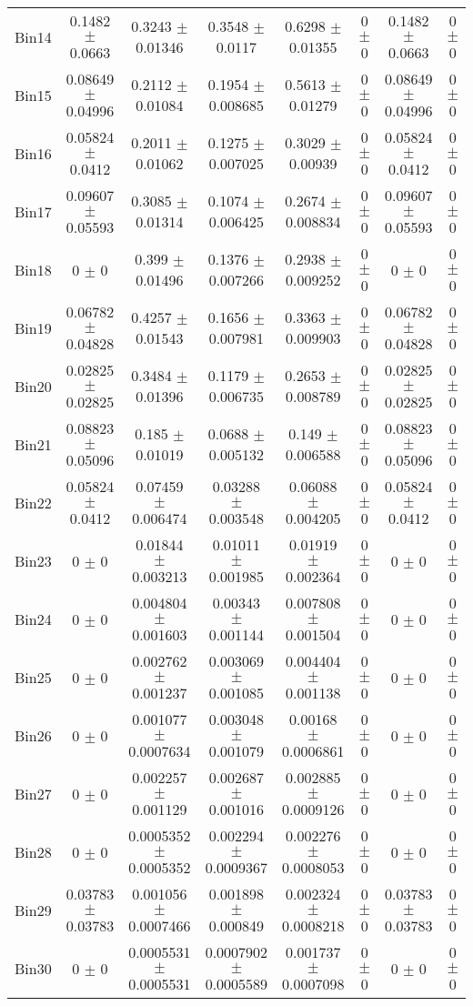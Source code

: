 \begin{tabular}{@{\extracolsep{4pt}}lccccccc@{}}
     Bin14 & 0.1482 $\pm$ 0.0663 & 0.3243 $\pm$ 0.01346 & 0.3548 $\pm$ 0.0117 & 0.6298 $\pm$ 0.01355 & 0 $\pm$ 0 & 0.1482 $\pm$ 0.0663 & 0 $\pm$ 0 \\ 
     Bin15 & 0.08649 $\pm$ 0.04996 & 0.2112 $\pm$ 0.01084 & 0.1954 $\pm$ 0.008685 & 0.5613 $\pm$ 0.01279 & 0 $\pm$ 0 & 0.08649 $\pm$ 0.04996 & 0 $\pm$ 0 \\ 
     Bin16 & 0.05824 $\pm$ 0.0412 & 0.2011 $\pm$ 0.01062 & 0.1275 $\pm$ 0.007025 & 0.3029 $\pm$ 0.00939 & 0 $\pm$ 0 & 0.05824 $\pm$ 0.0412 & 0 $\pm$ 0 \\ 
     Bin17 & 0.09607 $\pm$ 0.05593 & 0.3085 $\pm$ 0.01314 & 0.1074 $\pm$ 0.006425 & 0.2674 $\pm$ 0.008834 & 0 $\pm$ 0 & 0.09607 $\pm$ 0.05593 & 0 $\pm$ 0 \\ 
     Bin18 & 0 $\pm$ 0 & 0.399 $\pm$ 0.01496 & 0.1376 $\pm$ 0.007266 & 0.2938 $\pm$ 0.009252 & 0 $\pm$ 0 & 0 $\pm$ 0 & 0 $\pm$ 0 \\ 
     Bin19 & 0.06782 $\pm$ 0.04828 & 0.4257 $\pm$ 0.01543 & 0.1656 $\pm$ 0.007981 & 0.3363 $\pm$ 0.009903 & 0 $\pm$ 0 & 0.06782 $\pm$ 0.04828 & 0 $\pm$ 0 \\ 
     Bin20 & 0.02825 $\pm$ 0.02825 & 0.3484 $\pm$ 0.01396 & 0.1179 $\pm$ 0.006735 & 0.2653 $\pm$ 0.008789 & 0 $\pm$ 0 & 0.02825 $\pm$ 0.02825 & 0 $\pm$ 0 \\ 
     Bin21 & 0.08823 $\pm$ 0.05096 & 0.185 $\pm$ 0.01019 & 0.0688 $\pm$ 0.005132 & 0.149 $\pm$ 0.006588 & 0 $\pm$ 0 & 0.08823 $\pm$ 0.05096 & 0 $\pm$ 0 \\ 
     Bin22 & 0.05824 $\pm$ 0.0412 & 0.07459 $\pm$ 0.006474 & 0.03288 $\pm$ 0.003548 & 0.06088 $\pm$ 0.004205 & 0 $\pm$ 0 & 0.05824 $\pm$ 0.0412 & 0 $\pm$ 0 \\ 
     Bin23 & 0 $\pm$ 0 & 0.01844 $\pm$ 0.003213 & 0.01011 $\pm$ 0.001985 & 0.01919 $\pm$ 0.002364 & 0 $\pm$ 0 & 0 $\pm$ 0 & 0 $\pm$ 0 \\ 
     Bin24 & 0 $\pm$ 0 & 0.004804 $\pm$ 0.001603 & 0.00343 $\pm$ 0.001144 & 0.007808 $\pm$ 0.001504 & 0 $\pm$ 0 & 0 $\pm$ 0 & 0 $\pm$ 0 \\ 
     Bin25 & 0 $\pm$ 0 & 0.002762 $\pm$ 0.001237 & 0.003069 $\pm$ 0.001085 & 0.004404 $\pm$ 0.001138 & 0 $\pm$ 0 & 0 $\pm$ 0 & 0 $\pm$ 0 \\ 
     Bin26 & 0 $\pm$ 0 & 0.001077 $\pm$ 0.0007634 & 0.003048 $\pm$ 0.001079 & 0.00168 $\pm$ 0.0006861 & 0 $\pm$ 0 & 0 $\pm$ 0 & 0 $\pm$ 0 \\ 
     Bin27 & 0 $\pm$ 0 & 0.002257 $\pm$ 0.001129 & 0.002687 $\pm$ 0.001016 & 0.002885 $\pm$ 0.0009126 & 0 $\pm$ 0 & 0 $\pm$ 0 & 0 $\pm$ 0 \\ 
     Bin28 & 0 $\pm$ 0 & 0.0005352 $\pm$ 0.0005352 & 0.002294 $\pm$ 0.0009367 & 0.002276 $\pm$ 0.0008053 & 0 $\pm$ 0 & 0 $\pm$ 0 & 0 $\pm$ 0 \\ 
     Bin29 & 0.03783 $\pm$ 0.03783 & 0.001056 $\pm$ 0.0007466 & 0.001898 $\pm$ 0.000849 & 0.002324 $\pm$ 0.0008218 & 0 $\pm$ 0 & 0.03783 $\pm$ 0.03783 & 0 $\pm$ 0 \\ 
     Bin30 & 0 $\pm$ 0 & 0.0005531 $\pm$ 0.0005531 & 0.0007902 $\pm$ 0.0005589 & 0.001737 $\pm$ 0.0007098 & 0 $\pm$ 0 & 0 $\pm$ 0 & 0 $\pm$ 0 \\ 
\hline\hline
  \end{tabular}
